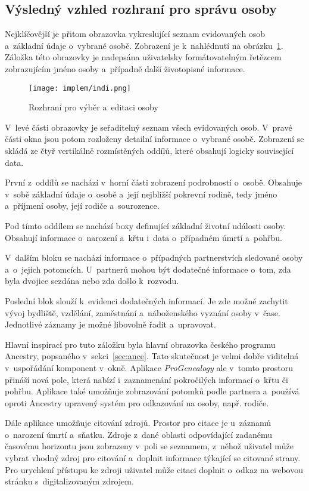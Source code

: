 		\subsection*{Výsledný vzhled rozhraní pro správu osoby}
		Nejklíčovější je přitom obrazovka vykreslující seznam evidovaných osob a~základní údaje o~vybrané osobě. Zobrazení je k~nahlédnutí na obrázku~\ref{fig:implemIndi}. Záložka této obrazovky je nadepsána uživatelsky formátovatelným řetězcem zobrazujícím jméno osoby a~případně další životopisné informace.\par
		\begin{figure}[h]
			\centering
			\texttt{[image: implem/indi.png]}
			\caption{Rozhraní pro výběr a~editaci osoby}
			\label{fig:implemIndi}
		\end{figure}
		V~levé části obrazovky je seřaditelný seznam všech evidovaných osob. V~pravé části okna jsou potom rozloženy detailní informace o~vybrané osobě. Zobrazení se skládá ze čtyř vertikálně rozmístěných oddílů, které obsahují logicky související data.\par
		První z~oddílů se nachází v~horní části zobrazení podrobností o~osobě. Obsahuje v~sobě základní údaje o~osobě a~její nejbližší pokrevní rodině, tedy jméno a~příjmení osoby, její rodiče a~sourozence.\par
		Pod tímto oddílem se nachází boxy definující základní životní události osoby. Obsahují informace o~narození a~křtu i~data o~případném úmrtí a~pohřbu.\par
		V~dalším bloku se nachází informace o~případných partnerstvích sledované osoby a~o~jejích potomcích. U~partnerů mohou být dodatečné informace o~tom, zda byla dvojice sezdána nebo zda došlo k~rozvodu.\par
		Poslední blok slouží k~evidenci dodatečných informací. Je zde možné zachytit vývoj bydliště, vzdělání, zaměstnání a~náboženského vyznání osoby v~čase. Jednotlivé záznamy je možné libovolně řadit a~upravovat.\par
		Hlavní inspirací pro tuto záložku byla hlavní obrazovka českého programu Ancestry, popsaného v~sekci~\ref{sec:ance}. Tato skutečnost je velmi dobře viditelná v~uspořádání komponent v~okně. Aplikace \emph{ProGenealogy} ale v~tomto prostoru přináší nová pole, která nabízí i~zaznamenání pokročilých informací o~křtu či pohřbu. Aplikace také umožňuje zobrazování potomků podle partnera a~používá oproti Ancestry upravený systém pro odkazování na osoby, např. rodiče.\par
		Dále aplikace umožňuje citování zdrojů. Prostor pro citace je u~záznamů o~narození úmrtí a~sňatku. Zdroje z~dané oblasti odpovídající zadanému časovému horizontu jsou zobrazeny v~poli se seznamem, z~něhož uživatel může vybrat vhodný zdroj pro citování a~doplnit informace týkající se citované strany. Pro urychlení přístupu ke zdroji uživatel může citaci doplnit o~odkaz na webovou stránku s~digitalizovaným zdrojem.\par
	
